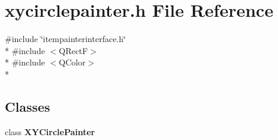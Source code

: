 \section{xycirclepainter.\+h File Reference}
\label{bk3_2circles_2xycirclepainter_8h}
{\ttfamily \#include \char`\"{}itempainterinterface.\+h\char`\"{}}\\*
{\ttfamily \#include $<$Q\+RectF$>$}\\*
{\ttfamily \#include $<$Q\+Color$>$}\\*
\subsection*{Classes}
\begin{DoxyCompactItemize}
\item 
class {\bf X\+Y\+Circle\+Painter}
\end{DoxyCompactItemize}
